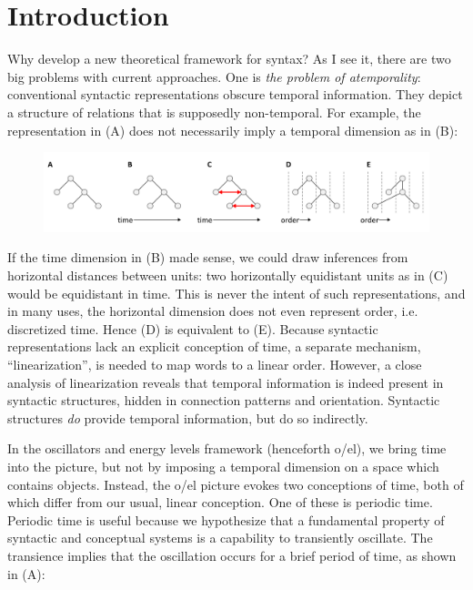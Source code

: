 \chapter{Introduction}

Why develop a new theoretical framework for syntax? As I see it, there are two big problems with current approaches. One is \textit{the problem of atemporality}: conventional syntactic representations obscure temporal information. They depict a structure of relations that is supposedly non-temporal. For example, the representation in (A) does not necessarily imply a temporal dimension as in (B): 

  
\begin{figure}
\includegraphics[width=\textwidth]{figures/Tilsen-img1.png}
\caption{\missingcaption}
\label{fig:1:1}
\end{figure}
 

  If the time dimension in (B) made sense, we could draw inferences from horizontal distances between units: two horizontally equidistant units as in (C) would be equidistant in time. This is never the intent of such representations, and in many uses, the horizontal dimension does not even represent order, i.e. discretized time. Hence (D) is equivalent to (E). Because syntactic representations lack an explicit conception of time, a separate mechanism, “linearization”, is needed to map words to a linear order.  However, a close analysis of linearization reveals that temporal information is indeed present in syntactic structures, hidden in connection patterns and orientation. Syntactic structures \textit{do} provide temporal information, but do so indirectly.

  In the oscillators and energy levels framework (henceforth o/el), we bring time into the picture, but not by imposing a temporal dimension on a space which contains objects. Instead, the o/el picture evokes two conceptions of time, both of which differ from our usual, linear conception. One of these is periodic time. Periodic time is useful because we hypothesize that a fundamental property of syntactic and conceptual systems is a capability to transiently oscillate. The transience implies that the oscillation occurs for a brief period of time, as shown in (A): 

